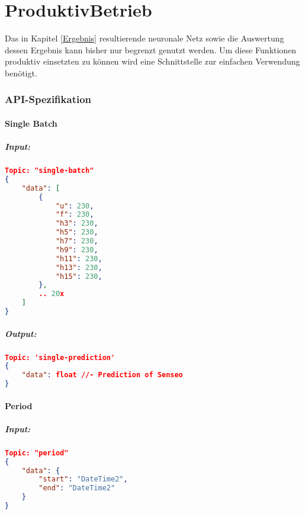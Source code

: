 \chapter{ProduktivBetrieb}
    Das in Kapitel \ref{Ergebnis} resultierende neuronale Netz sowie die Auswertung dessen Ergebnis kann bisher nur begrenzt genutzt werden.
    Um diese Funktionen produktiv einsetzten zu können wird eine Schnittstelle zur einfachen Verwendung benötigt.
    

    \subsection{API-Spezifikation}
        \subsubsection{Single Batch}
        \paragraph{Input:}

            \begin{lstlisting}[language=json,firstnumber=1]
Topic: "single-batch"
{
    "data": [
        {
            "u": 230,
            "f": 230,
            "h3": 230,
            "h5": 230,
            "h7": 230,
            "h9": 230,
            "h11": 230,
            "h13": 230,
            "h15": 230,
        },
        .. 20x
    ]
}
            \end{lstlisting}
        
            \paragraph{Output:}
        
            \begin{lstlisting}[language=json,firstnumber=1]
Topic: 'single-prediction'
{
    "data": float //- Prediction of Senseo
}
            \end{lstlisting}
    
        \subsubsection{Period}
            \paragraph{Input:}
    
                \begin{lstlisting}[language=json,firstnumber=1]
Topic: "period"
{
    "data": {
        "start": "DateTime2",
        "end": "DateTime2"
    }
}
                \end{lstlisting}
            
